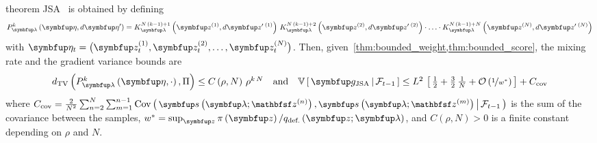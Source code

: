 
\begin{theoremEnd}{theorem}\label{thm:jsa}
  JSA~\citep{pmlr-v124-ou20a} is obtained by defining 
  {%
  \begin{align*}
  P_{\vlambda}^k\left(\veta, d\veta^{\prime}\right)
  = 
  K_{\vlambda}^{N\,\left(k-1\right) + 1}\left(\vz^{(1)}, d\vz^{\prime\;(1)}\right)
  \,
  K_{\vlambda}^{N\,\left(k-1\right) + 2}\left(\vz^{(2)}, d\vz^{\prime\;(2)}\right)
  \cdot
  \ldots 
  \cdot
  K_{\vlambda}^{N\,\left(k-1\right) + N}\left(\vz^{(N)}, d\vz^{\prime\;(N)}\right)
  \end{align*}
  }%
  with \(\veta_t = \big(\vz_t^{(1)}, \vz_t^{(2)}, \ldots, \vz_t^{(N)}\big)\).
  Then, given~\cref{thm:bounded_weight,thm:bounded_score}, the mixing rate and the gradient variance bounds are
  {%
  \begin{align*}
    \textstyle
    \DTV{P_{\vlambda}^k\left(\veta, \cdot\right)}{\Pi}
    \leq
    C\left(\rho, N\right)\,{\rho}^{k\,N}
    \quad\text{and}\quad
    \V{ \vg_{\mathrm{JSA}} \,\middle|\, \mathcal{F}_{t-1} }
    \leq
    L^2 \,
    \left[\,
    \frac{1}{2} + \frac{3}{2}\,\frac{1}{N}
    + \mathcal{O}\left(\nicefrac{1}{w^*}\right)
    \,\right]
    +
    C_{\text{cov}}
  \end{align*}
  }%
  where
  \(\small\textstyle
  C_{\text{cov}} = \frac{2}{N^2} \sum^{N}_{n=2} \sum^{n-1}_{m = 1} \Cov{\vs\left(\vlambda; \rvvz^{(n)}\right), \vs\left(\vlambda; \rvvz^{(m)}\right) \,\middle|\, \mathcal{F}_{t-1} }
  \) is the sum of the covariance between the samples, \(w^* = \sup_{\vz} \pi\left(\vz\right) / q_{\text{def.}}\left(\vz;\vlambda\right)\), and \(C\left(\rho, N\right) > 0\) is a finite constant depending on \(\rho\) and \(N\).
\end{theoremEnd}
